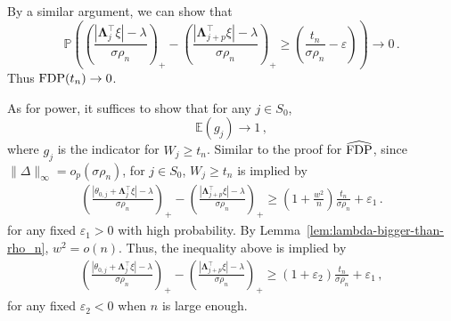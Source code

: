 \documentclass[11pt]{article}
\newcommand{\bLambda}{\boldsymbol{\Lambda}}
\newcommand{\FDP}{{\rm FDP}}
\newcommand{\Expected}{\mathbb{E}}
\newcommand{\Prob}{\mathbb{P}}
\begin{document}
By a similar argument, we can show that
\[
\Prob\left(\left(\frac{|\bLambda_j^\top\xi|-\lambda}{\sigma\rho_n}\right)_+-\left(\frac{|\bLambda_{j+p}^\top\xi|-\lambda}{\sigma\rho_n}\right)_+\ge \left(\frac{t_n}{\sigma\rho_n}-\varepsilon\right)\right)\to0\,.
\]
Thus $\FDP(t_n) \to 0$.

As for power, it suffices to show that for any $j\in S_0$,
\[
\Expected(g_j)\to1\,,
\]
where $g_j$ is the indicator for $W_j\ge t_n$. Similar to the proof for $\widehat \FDP$, since $\|\Delta\|_\infty = o_p(\sigma\rho_n)$, for $j\in S_0$, $W_j\ge t_n$ is implied by 
\begin{align}\label{eq:power-1-1}
\left(\frac{|\theta_{0,j}+\bLambda_j^\top\xi|-\lambda}{\sigma\rho_n}\right)_+-\left(\frac{|\bLambda_{j+p}^\top\xi|-\lambda}{\sigma\rho_n}\right)_+\ge\left(1+\frac{w^2}{n}\right)\frac{t_n}{\sigma\rho_n}  +\varepsilon_1\,.
\end{align}
for any fixed $\varepsilon_1>0$ with high probability. By Lemma~\ref{lem:lambda-bigger-than-rho_n}, $w^2 = o(n)$. Thus, the inequality above is implied by
\begin{align}\label{eq:power-1-2}
\left(\frac{|\theta_{0,j}+\bLambda_j^\top\xi|-\lambda}{\sigma\rho_n}\right)_+-\left(\frac{|\bLambda_{j+p}^\top\xi|-\lambda}{\sigma\rho_n}\right)_+\ge\left(1+\varepsilon_2\right)\frac{t_n}{\sigma\rho_n}  +\varepsilon_1\,,
\end{align}
for any fixed $\varepsilon_2<0$ when $n$ is large enough. 
\end{document}
